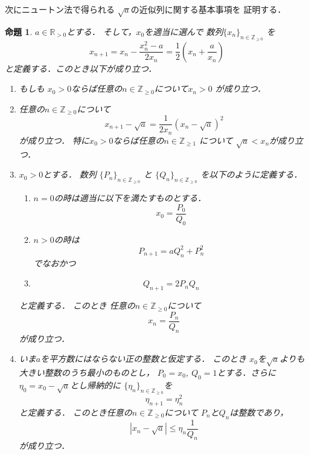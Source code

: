 \documentclass[leqno, a4paper, 12pt]{jsarticle}
\newtheorem{prop}[thm]{命題}
\newcommand{\zz}{\mathbb{Z}}
\newcommand{\rr}{\mathbb{R}}
\begin{document}
次にニュートン法で得られる
$\sqrt{a}$の近似列に関する基本事項を
証明する．
\begin{prop}\label{prop:kkk}
$a\in \rr_{>0}$とする．
そして，$x_{0}$を適当に選んで
数列$\{x_{n}\}_{n\in \zz_{\ge 0}}$
を
\[
x_{n+1}=x_{n}-\frac{x_{n}^{2}-a}{2x_{n}}
=\frac{1}{2}\left(x_{n}+\frac{a}{x_{n}}\right)
\]
と定義する．このとき以下が成り立つ．
\begin{enumerate}[label=\textup{(\arabic*)}]
\item\label{item:11}
もしも
$x_{0}>0$ならば任意の$n\in \zz_{\ge 0}$について$x_{n}>0$
が成り立つ．
\item\label{item:22}
任意の$n\in \zz_{\ge 0}$について
\[
x_{n+1}-\sqrt{a}=\frac{1}{2x_{n}}(x_{n}-\sqrt{a})^{2}
\]
が成り立つ．
特に$x_{0}>0$ならば任意の$n\in \zz_{\ge 1}$
について
$\sqrt{a}<x_{n}$が成り立つ．
\item\label{item:33}
$x_{0}>0$とする．
数列
$\{P_{n}\}_{n\in \zz_{\ge 0}}$
と
$\{Q_{n}\}_{n\in \zz_{\ge 0}}$
を以下のように定義する．
\begin{enumerate}
\item 
$n=0$の時は適当に以下を満たすものとする．
\[
x_{0}=\frac{P_{0}}{Q_{0}}
\]
\item 
$n>0$の時は
\[
P_{n+1}=aQ_{n}^{2}+P_{n}^{2}
\]
でなおかつ
\item 
\[
Q_{n+1}=2P_{n}Q_{n}
\]
\end{enumerate}
と定義する．
このとき
任意の$n\in \zz_{\ge 0}$について
\[
x_{n}=\frac{P_{n}}{Q_{n}}
\]
が成り立つ．
\item\label{item:44}
いま$a$を平方数にはならない正の整数と仮定する．
このとき
$x_{0}$を$\sqrt{a}$よりも大きい整数のうち最小のものとし，
$P_{0}=x_{0}$, $Q_{0}=1$とする．さらに
$\eta_{0}=x_{0}-\sqrt{a}$とし帰納的に
$\{\eta_{n}\}_{n\in \zz_{\ge 0}}$を
\[
\eta_{n+1}=\eta_{n}^{2}
\]
と定義する．
このとき任意の$n\in \zz_{\ge 0}$について
$P_{n}$と$Q_{n}$は整数であり，
\[
|x_{n}-\sqrt{a}|\le \eta_{n}\frac{1}{Q_{n}}
\]
が成り立つ．


\end{enumerate}
\end{prop}
\end{document}
